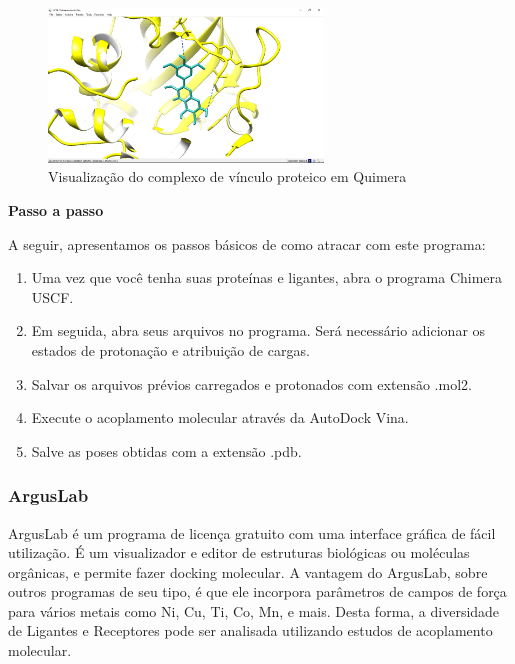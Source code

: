 \documentclass[11pt, letterpaper, portuguese]{article}
\begin{document}
\begin{figure}
	    \centering
		\caption{Visualização do complexo de vínculo proteico em Quimera   \cite{Pettersen_2004}}
		\includegraphics[width=0.65\textwidth]{chimera}
	\end{figure}

        \par{\textbf{Passo a passo}}
        \par{A seguir, apresentamos os passos básicos de como atracar com este programa:}
            \begin{enumerate}[1.]
            \item Uma vez que você tenha suas proteínas e ligantes, abra o programa Chimera USCF.
            \item Em seguida, abra seus arquivos no programa. Será necessário adicionar os estados de protonação e atribuição de cargas.
            \item Salvar os arquivos prévios carregados e protonados com extensão .mol2.
            \item Execute o acoplamento molecular através da AutoDock Vina.
            \item Salve as poses obtidas com a extensão .pdb.
            \end{enumerate} 
\subsubsection{ArgusLab}
        \par ArgusLab é um programa de licença gratuito com uma interface gráfica de fácil utilização. É um visualizador e editor de estruturas biológicas ou moléculas orgânicas, e permite fazer docking molecular. A vantagem do ArgusLab, sobre outros programas de seu tipo, é que ele incorpora parâmetros de campos de força para vários metais como Ni, Cu, Ti, Co, Mn, e mais. Desta forma, a diversidade de Ligantes e Receptores pode ser analisada utilizando estudos de acoplamento molecular.
        
\end{document}
